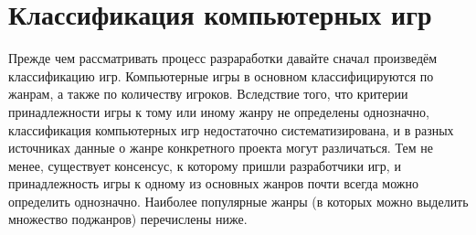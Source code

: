 \chapter{Классификация компьютерных игр}
Прежде чем рассматривать процесс разраработки давайте сначал произведём классификацию игр. Компьютерные 
игры в основном классифицируются по жанрам, а также по количеству игроков. Вследствие того, что критерии 
принадлежности игры к тому или иному жанру не определены однозначно, классификация компьютерных игр 
недостаточно систематизирована, и в разных источниках данные о жанре конкретного проекта могут различаться. 
Тем не менее, существует консенсус, к которому пришли разработчики игр, и принадлежность игры к одному из 
основных жанров почти всегда можно определить однозначно. Наиболее популярные жанры (в которых можно 
выделить множество поджанров) перечислены ниже.

